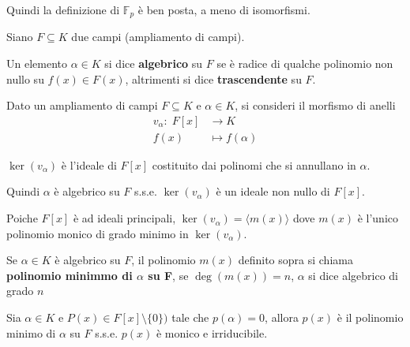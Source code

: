\documentclass[../main.tex]{subfiles}
\begin{document}
Quindi la definizione di $\mathbb{F}_p$ è ben posta, a meno di isomorfismi.

\begin{definition}
    Siano $F \subseteq K$ due campi (ampliamento di campi).

    Un elemento $\alpha \in K$ si dice \textbf{algebrico} su $F$ se è radice di qualche polinomio non nullo su $f(x) \in F(x)$, altrimenti si dice \textbf{trascendente} su $F$.
\end{definition}

Dato un ampliamento di campi $F \subseteq K$ e  $\alpha \in K$, si consideri il morfismo di anelli
\begin{align*}
    v_\alpha : \; F[x] & \rightarrow K     \\
    f(x)               & \mapsto f(\alpha)
\end{align*}

$\ker(v_\alpha)$ è l'ideale di $F[x]$ costituito dai polinomi che si annullano in $\alpha$.

Quindi $\alpha$ è algebrico su $F$ s.s.e. $\ker(v_\alpha)$ è un ideale non nullo di $F[x]$.

Poiche $F[x]$ è ad ideali principali, $\ker(v_\alpha) = \langle m(x)\rangle$ dove $m(x)$ è l'unico polinomio monico di grado minimo in $\ker(v_\alpha)$.

\begin{definition}
    Se $\alpha \in K$ è algebrico su $F$, il polinomio $m(x)$ definito sopra si chiama \textbf{polinomio minimmo di $\alpha$ su F}, se $\deg(m(x)) = n$, $\alpha $ si dice algebrico di grado $n$
\end{definition}

\begin{note}
    Sia $\alpha \in K$ e $P(x) \in F[x] \setminus \{0\})$ tale che $p(\alpha) = 0$, allora $p(x)$ è il polinomio minimo di $\alpha$ su $F$ s.s.e. $p(x)$ è monico e irriducibile.
\end{note}
\end{document}
